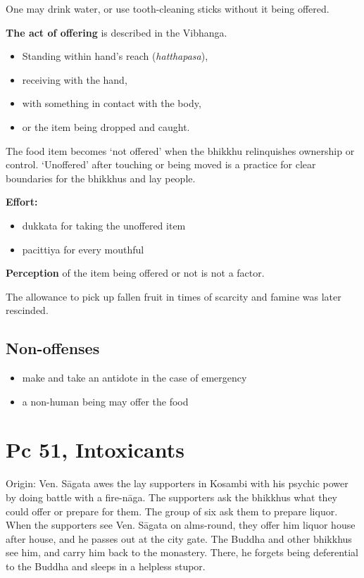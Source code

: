 One may drink water, or use tooth-cleaning sticks without it being
offered.

\textbf{The act of offering} is described in the Vibhanga.

\begin{itemize}
\tightlist
\item
  Standing within hand's reach (\emph{hatthapasa}),
\item
  receiving with the hand,
\item
  with something in contact with the body,
\item
  or the item being dropped and caught.
\end{itemize}

The food item becomes `not offered' when the bhikkhu relinquishes
ownership or control. `Unoffered' after touching or being moved is a
practice for clear boundaries for the bhikkhus and lay people.

\textbf{Effort:}

\begin{itemize}
\tightlist
\item
  dukkata for taking the unoffered item
\item
  pacittiya for every mouthful
\end{itemize}

\clearpage

\textbf{Perception} of the item being offered or not is not a factor.

The allowance to pick up fallen fruit in times of scarcity and famine
was later rescinded.

\subsection{Non-offenses}

\begin{itemize}
\tightlist
\item
  make and take an antidote in the case of emergency
\item
  a non-human being may offer the food
\end{itemize}

\section{Pc 51, Intoxicants}

Origin: Ven. Sāgata awes the lay supporters in Kosambi with his psychic
power by doing battle with a fire-nāga. The supporters ask the bhikkhus
what they could offer or prepare for them. The group of six ask them to
prepare liquor. When the supporters see Ven. Sāgata on alms-round, they
offer him liquor house after house, and he passes out at the city gate.
The Buddha and other bhikkhus see him, and carry him back to the
monastery. There, he forgets being deferential to the Buddha and sleeps
in a helpless stupor.


